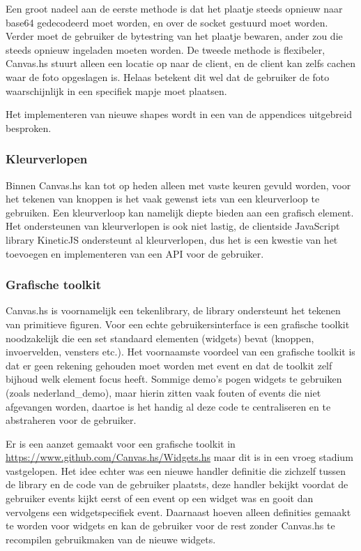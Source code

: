 Een groot nadeel aan de eerste methode is dat het plaatje steeds opnieuw naar base64 gedecodeerd moet worden, en over de socket gestuurd moet worden. Verder moet de gebruiker de bytestring van het plaatje bewaren, ander zou die steeds opnieuw ingeladen moeten worden. De tweede methode is flexibeler, Canvas.hs stuurt alleen een locatie op naar de client, en de client kan zelfs cachen waar de foto opgeslagen is. Helaas betekent dit wel dat de gebruiker de foto waarschijnlijk in een specifiek mapje moet plaatsen.

Het implementeren van nieuwe shapes wordt in een van de appendices uitgebreid besproken.

\subsubsection{Kleurverlopen}
Binnen Canvas.hs kan tot op heden alleen met vaste keuren gevuld worden, voor het tekenen van knoppen is het vaak gewenst iets van een kleurverloop te gebruiken. Een kleurverloop kan namelijk diepte bieden aan een grafisch element. Het ondersteunen van kleurverlopen is ook niet lastig, de clientside JavaScript library KineticJS ondersteunt al kleurverlopen, dus het is een kwestie van het toevoegen en implementeren van een API voor de gebruiker.

\subsubsection{Grafische toolkit}
Canvas.hs is voornamelijk een tekenlibrary, de library ondersteunt het tekenen van primitieve figuren. Voor een echte gebruikersinterface is een grafische toolkit noodzakelijk die een set standaard elementen (widgets) bevat (knoppen, invoervelden, vensters etc.). Het voornaamste voordeel van een grafische toolkit is dat er geen rekening gehouden moet worden met event en dat de toolkit zelf bijhoud welk element focus heeft. Sommige demo's pogen widgets te gebruiken (zoals nederland\_demo), maar hierin zitten vaak fouten of events die niet afgevangen worden, daartoe is het handig al deze code te centraliseren en te abstraheren voor de gebruiker.

Er is een aanzet gemaakt voor een grafische toolkit in \url{https://www.github.com/Canvas.hs/Widgets.hs} maar dit is in een vroeg stadium vastgelopen. Het idee echter was een nieuwe handler definitie die zichzelf tussen de library en de code van de gebruiker plaatsts, deze handler bekijkt voordat de gebruiker events kijkt eerst of een event op een widget was en gooit dan vervolgens een widgetspecifiek event. Daarnaast hoeven alleen definities gemaakt te worden voor widgets en kan de gebruiker voor de rest zonder Canvas.hs te recompilen gebruikmaken van de nieuwe widgets.

